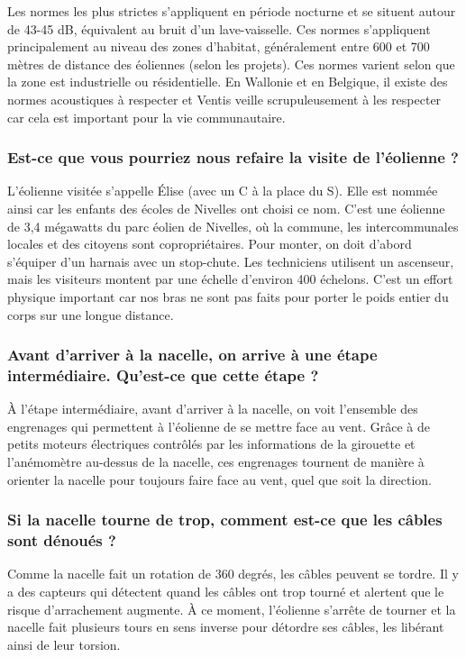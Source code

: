 Les normes les plus strictes s'appliquent en période nocturne et se situent autour de 43-45 dB, équivalent au bruit d'un lave-vaisselle. Ces normes s'appliquent principalement au niveau des zones d'habitat, généralement entre 600 et 700 mètres de distance des éoliennes (selon les projets). Ces normes varient selon que la zone est industrielle ou résidentielle. En Wallonie et en Belgique, il existe des normes acoustiques à respecter et Ventis veille scrupuleusement à les respecter car cela est important pour la vie communautaire.

\subsubsection{Est-ce que vous pourriez nous refaire la visite de l'éolienne ?}

L'éolienne visitée s'appelle Élise (avec un C à la place du S). Elle est nommée ainsi car les enfants des écoles de Nivelles ont choisi ce nom. C'est une éolienne de 3,4 mégawatts du parc éolien de Nivelles, où la commune, les intercommunales locales et des citoyens sont copropriétaires. Pour monter, on doit d'abord s'équiper d'un harnais avec un stop-chute. Les techniciens utilisent un ascenseur, mais les visiteurs montent par une échelle d'environ 400 échelons. C'est un effort physique important car nos bras ne sont pas faits pour porter le poids entier du corps sur une longue distance.

\subsubsection{Avant d'arriver à la nacelle, on arrive à une étape intermédiaire. Qu'est-ce que cette étape ?}

À l'étape intermédiaire, avant d'arriver à la nacelle, on voit l'ensemble des engrenages qui permettent à l'éolienne de se mettre face au vent. Grâce à de petits moteurs électriques contrôlés par les informations de la girouette et l'anémomètre au-dessus de la nacelle, ces engrenages tournent de manière à orienter la nacelle pour toujours faire face au vent, quel que soit la direction.

\subsubsection{Si la nacelle tourne de trop, comment est-ce que les câbles sont dénoués ?}

Comme la nacelle fait un rotation de 360 degrés, les câbles peuvent se tordre. Il y a des capteurs qui détectent quand les câbles ont trop tourné et alertent que le risque d'arrachement augmente. À ce moment, l'éolienne s'arrête de tourner et la nacelle fait plusieurs tours en sens inverse pour détordre ses câbles, les libérant ainsi de leur torsion.

